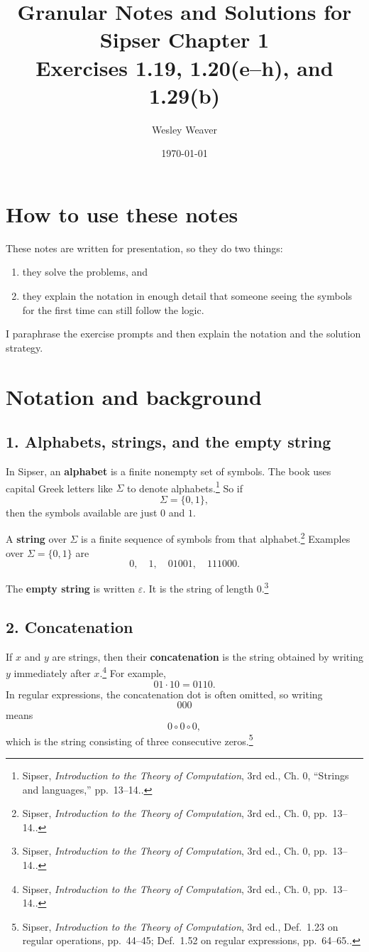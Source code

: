 \documentclass[12pt]{article}
\title{Granular Notes and Solutions for Sipser Chapter 1\\
Exercises 1.19, 1.20(e--h), and 1.29(b)}
\author{Wesley Weaver}
\date{\today}
\newcommand{\sipser}[1]{\footnote{Sipser, \emph{Introduction to the Theory of Computation}, 3rd ed., #1.}}
\begin{document}
\maketitle

\section*{How to use these notes}

These notes are written for presentation, so they do two things:
\begin{enumerate}[itemsep=0.3em]
    \item they solve the problems, and
    \item they explain the notation in enough detail that someone seeing the symbols for the first time can still follow the logic.
\end{enumerate}

I paraphrase the exercise prompts and then explain the notation and the solution strategy.

\section*{Notation and background}

\subsection*{1. Alphabets, strings, and the empty string}

In Sipser, an \textbf{alphabet} is a finite nonempty set of symbols. The book uses capital Greek letters like \(\Sigma\) to denote alphabets.\sipser{Ch. 0, ``Strings and languages,'' pp.~13--14.} So if
\[
\Sigma=\{0,1\},
\]
then the symbols available are just \(0\) and \(1\).

A \textbf{string} over \(\Sigma\) is a finite sequence of symbols from that alphabet.\sipser{Ch. 0, pp.~13--14.} Examples over \(\Sigma=\{0,1\}\) are
\[
0,\quad 1,\quad 01001,\quad 111000.
\]

The \textbf{empty string} is written \(\varepsilon\). It is the string of length \(0\).\sipser{Ch. 0, pp.~13--14.}

\subsection*{2. Concatenation}

If \(x\) and \(y\) are strings, then their \textbf{concatenation} is the string obtained by writing \(y\) immediately after \(x\).\sipser{Ch. 0, pp.~13--14.} For example,
\[
01 \cdot 10 = 0110.
\]
In regular expressions, the concatenation dot is often omitted, so writing
\[
000
\]
means
\[
0 \circ 0 \circ 0,
\]
which is the string consisting of three consecutive zeros.\sipser{Def.~1.23 on regular operations, pp.~44--45; Def.~1.52 on regular expressions, pp.~64--65.}
\end{document}
